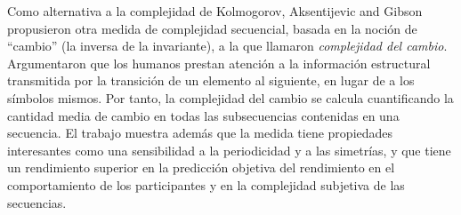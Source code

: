 Como alternativa a la complejidad de Kolmogorov, Aksentijevic and Gibson~\cite{f47} propusieron otra medida de complejidad secuencial, basada en la noción de ``cambio'' (la inversa de la invariante), a la que llamaron \textit{complejidad del cambio}. Argumentaron que los humanos prestan atención a la información estructural transmitida por la transición de un elemento al siguiente, en lugar de a los símbolos mismos. Por tanto, la complejidad del cambio se calcula cuantificando la cantidad media de cambio en todas las subsecuencias contenidas en una secuencia. El trabajo muestra además que la medida tiene propiedades interesantes como una sensibilidad a la periodicidad y a las simetrías, y que tiene un rendimiento superior en la predicción objetiva del rendimiento en el comportamiento de los participantes y en la complejidad subjetiva de las secuencias.



